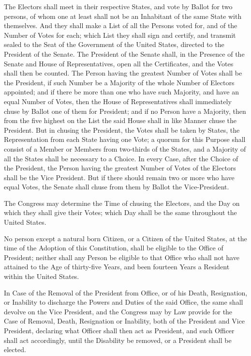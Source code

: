 \documentclass{constitution}
\begin{document}
The Electors shall meet in their respective States, and vote by Ballot for two persons,
of whom one at least shall not be an Inhabitant of the same State with themselves.
And they shall make a List of all the Persons voted for, and of the Number of Votes for each;
which List they shall sign and certify,
and transmit sealed to the Seat of the Government of the United States,
directed to the President of the Senate.
The President of the Senate shall,
in the Presence of the Senate and House of Representatives,
open all the Certificates, and the Votes shall then be counted.
The Person having the greatest Number of Votes shall be the President,
if such Number be a Majority of the whole Number of Electors appointed;
and if there be more than one who have such Majority, and have an equal Number of Votes,
then the House of Representatives shall immediately chuse by Ballot one of them for President;
and if no Person have a Majority,
then from the five highest on the List the said House shall in like Manner chuse the President.
But in chusing the President, the Votes shall be taken by States,
the Representation from each State having one Vote;
a quorum for this Purpose shall consist of a Member or Members from two-thirds of the States,
and a Majority of all the States shall be necessary to a Choice.
In every Case, after the Choice of the President,
the Person having the greatest Number of Votes of the Electors shall be the Vice President.
But if there should remain two or more who have equal Votes,
the Senate shall chuse from them by Ballot the Vice-President.

The Congress may determine the Time of chusing the Electors,
and the Day on which they shall give their Votes;
which Day shall be the same throughout the United States.

No person except a natural born Citizen,
or a Citizen of the United States, at the time of the Adoption of this Constitution,
shall be eligible to the Office of President;
neither shall any Person be eligible to that Office who shall not
have attained to the Age of thirty-five Years,
and been fourteen Years a Resident within the United States.

In Case of the Removal of the President from Office,
or of his Death, Resignation, or Inability to discharge the Powers and Duties of the said Office,
the same shall devolve on the Vice President,
and the Congress may by Law provide for the Case
of Removal, Death, Resignation or Inability,
both of the President and Vice President,
declaring what Officer shall then act as President,
and such Officer shall act accordingly,
until the Disability be removed, or a President shall be elected.
\end{document}
